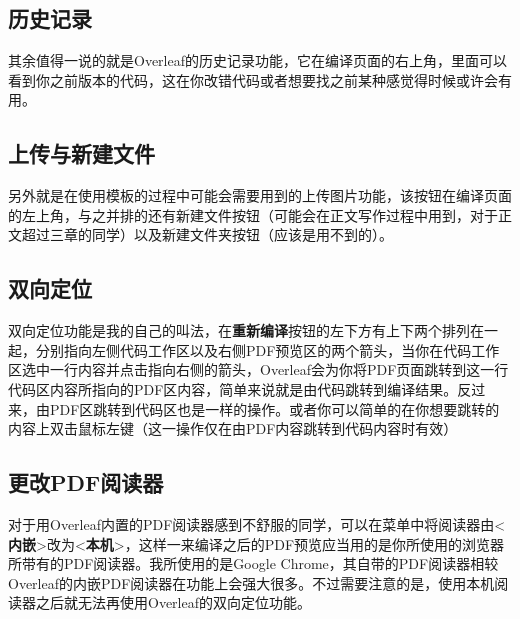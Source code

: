 \subsection{历史记录}
其余值得一说的就是Overleaf的历史记录功能，它在编译页面的右上角，里面可以看到你之前版本的代码，这在你改错代码或者想要找之前某种感觉得时候或许会有用。
\subsection{上传与新建文件}

另外就是在使用模板的过程中可能会需要用到的上传图片功能，该按钮在编译页面的左上角，与之并排的还有新建文件按钮（可能会在正文写作过程中用到，对于正文超过三章的同学）以及新建文件夹按钮（应该是用不到的）。

\subsection{双向定位}
双向定位功能是我的自己的叫法，在\textbf{重新编译}按钮的左下方有上下两个排列在一起，分别指向左侧代码工作区以及右侧PDF预览区的两个箭头，当你在代码工作区选中一行内容并点击指向右侧的箭头，Overleaf会为你将PDF页面跳转到这一行代码区内容所指向的PDF区内容，简单来说就是由代码跳转到编译结果。反过来，由PDF区跳转到代码区也是一样的操作。或者你可以简单的在你想要跳转的内容上双击鼠标左键（这一操作仅在由PDF内容跳转到代码内容时有效）
\subsection{更改PDF阅读器}
对于用Overleaf内置的PDF阅读器感到不舒服的同学，可以在菜单中将阅读器由<\textbf{内嵌}>改为<\textbf{本机}>，这样一来编译之后的PDF预览应当用的是你所使用的浏览器所带有的PDF阅读器。我所使用的是Google Chrome，其自带的PDF阅读器相较Overleaf的内嵌PDF阅读器在功能上会强大很多。不过需要注意的是，使用本机阅读器之后就无法再使用Overleaf的双向定位功能。

